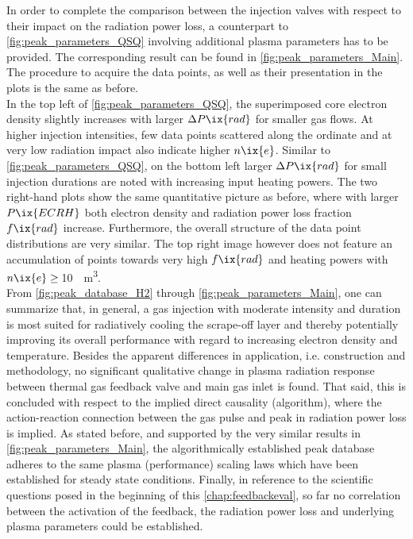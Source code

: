 %
        In order to complete the comparison between the injection valves with respect to their impact on the radiation power loss, a counterpart to \cref{fig:peak_parameters_QSQ} involving additional plasma parameters has to be provided. The corresponding result can be found in \cref{fig:peak_parameters_Main}. The procedure to acquire the data points, as well as their presentation in the plots is the same as before.\\%
        In the top left of \cref{fig:peak_parameters_QSQ}, the superimposed core electron density slightly increases with larger $\Delta P\ix{rad}$ for smaller gas flows. At higher injection intensities, few data points scattered along the ordinate and at very low radiation impact also indicate higher $n\ix{e}$. Similar to \cref{fig:peak_parameters_QSQ}, on the bottom left larger $\Delta P\ix{rad}$ for small injection durations are noted with increasing input heating powers. The two right-hand plots show the same quantitative picture as before, where with larger $P\ix{ECRH}$ both electron density and radiation power loss fraction $f\ix{rad}$ increase. Furthermore, the overall structure of the data point distributions are very similar. The top right image however does not feature an accumulation of points towards very high $f\ix{rad}$ and heating powers with $n\ix{e}\ge\,$\SI{10}{\per\cubic\meter}.\\%
        From \cref{fig:peak_database_H2} through \cref{fig:peak_parameters_Main}, one can summarize that, in general, a gas injection with moderate intensity and duration is most suited for radiatively cooling the scrape-off layer and thereby potentially improving its overall performance with regard to increasing electron density and temperature. Besides the apparent differences in application, i.e. construction and methodology, no significant qualitative change in plasma radiation response between thermal gas feedback valve and main gas inlet is found. That said, this is concluded with respect to the implied direct causality (algorithm), where the action-reaction connection between the gas pulse and peak in radiation power loss is implied. As stated before, and supported by the very similar results in \cref{fig:peak_parameters_Main}, the algorithmically established peak database adheres to the same plasma (performance) scaling laws which have been established for steady state conditions. Finally, in reference to the scientific questions posed in the beginning of this \cref{chap:feedbackeval}, so far no correlation between the activation of the feedback, the radiation power loss and underlying plasma parameters could be established.%


